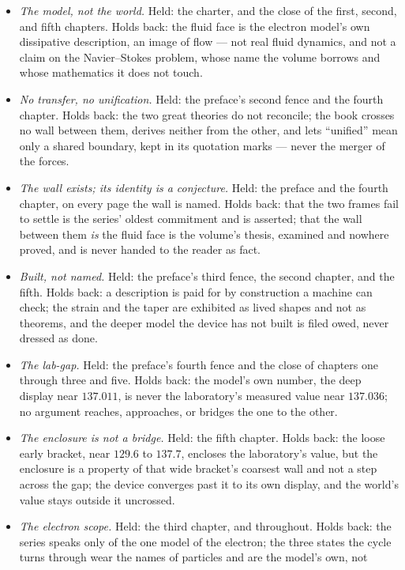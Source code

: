 \begin{itemize}
\item \emph{The model, not the world.} Held: the charter, and the close of the
first, second, and fifth chapters. Holds back: the fluid face is the electron
model's own dissipative description, an image of flow --- not real fluid
dynamics, and not a claim on the Navier--Stokes problem, whose name the volume
borrows and whose mathematics it does not touch.
\item \emph{No transfer, no unification.} Held: the preface's second fence and
the fourth chapter. Holds back: the two great theories do not reconcile; the book
crosses no wall between them, derives neither from the other, and lets ``unified''
mean only a shared boundary, kept in its quotation marks --- never the merger of
the forces.
\item \emph{The wall exists; its identity is a conjecture.} Held: the preface and
the fourth chapter, on every page the wall is named. Holds back: that the two
frames fail to settle is the series' oldest commitment and is asserted; that the
wall between them \emph{is} the fluid face is the volume's thesis, examined and
nowhere proved, and is never handed to the reader as fact.
\item \emph{Built, not named.} Held: the preface's third fence, the second
chapter, and the fifth. Holds back: a description is paid for by construction a
machine can check; the strain and the taper are exhibited as lived shapes and not
as theorems, and the deeper model the device has not built is filed owed, never
dressed as done.
\item \emph{The lab-gap.} Held: the preface's fourth fence and the close of
chapters one through three and five. Holds back: the model's own number, the deep
display near $137.011$, is never the laboratory's measured value near $137.036$;
no argument reaches, approaches, or bridges the one to the other.
\item \emph{The enclosure is not a bridge.} Held: the fifth chapter. Holds back:
the loose early bracket, near $129.6$ to $137.7$, encloses the laboratory's
value, but the enclosure is a property of that wide bracket's coarsest wall and
not a step across the gap; the device converges past it to its own display, and
the world's value stays outside it uncrossed.
\item \emph{The electron scope.} Held: the third chapter, and throughout. Holds
back: the series speaks only of the one model of the electron; the three states
the cycle turns through wear the names of particles and are the model's own, not

\end{itemize}
